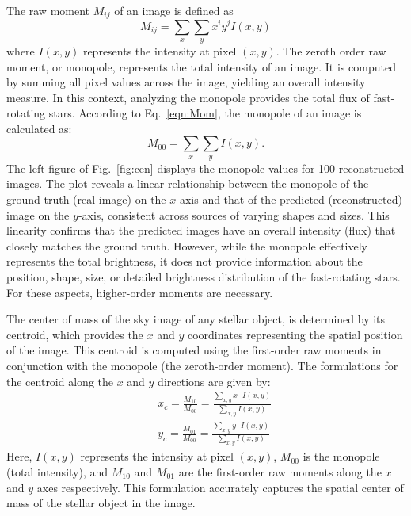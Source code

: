 The raw moment $M_{ij}$ of an image is defined as \citep{hu1962visual}
\begin{equation}
	M_{ij} = \sum_{x} \sum_{y} x^i y^j I(x, y)
	\label{eqn:Mom}
\end{equation}
where $I(x,y)$ represents the intensity at pixel $(x,y)$. The zeroth order raw moment, or monopole, represents the total intensity of an image. It is computed by summing all pixel values across the image, yielding an overall intensity measure. In this context, analyzing the monopole provides the total flux of fast-rotating stars. According to Eq.~\eqref{eqn:Mom}, the monopole of an image is calculated as:
\begin{equation}
	M_{00} = \sum_{x} \sum_{y} I(x, y).
\end{equation}
The left figure of Fig.~\ref{fig:cen} displays the monopole values for 100 reconstructed images. The plot reveals a linear relationship between the monopole of the ground truth (real image) on the $x$-axis and that of the predicted (reconstructed) image on the $y$-axis, consistent across sources of varying shapes and sizes. This linearity confirms that the predicted images have an overall intensity (flux) that closely matches the ground truth. However, while the monopole effectively represents the total brightness, it does not provide information about the position, shape, size, or detailed brightness distribution of the fast-rotating stars. For these aspects, higher-order moments are necessary.

The center of mass of the sky image of any stellar object, is determined by its centroid, which provides the $x$ and $y$ coordinates representing the spatial position of the image. This centroid is computed using the first-order raw moments in conjunction with the monopole (the zeroth-order moment). The formulations for the centroid along the $x$ and $y$ directions are given by:
\begin{eqnarray}
&&x_c = \frac{M_{10}}{M_{00}} = \frac{\sum_{x,y} x \cdot I(x,y)}{\sum_{x,y} I(x,y)} \nonumber \\
&&y_c = \frac{M_{01}}{M_{00}} = \frac{\sum_{x,y} y \cdot I(x,y)}{\sum_{x,y} I(x,y)}
\end{eqnarray}
Here, \(I(x,y)\) represents the intensity at pixel \((x,y)\), \(M_{00}\) is the monopole (total intensity), and \(M_{10}\) and \(M_{01}\) are the first-order raw moments along the $x$ and $y$ axes respectively. This formulation accurately captures the spatial center of mass of the stellar object in the image.

